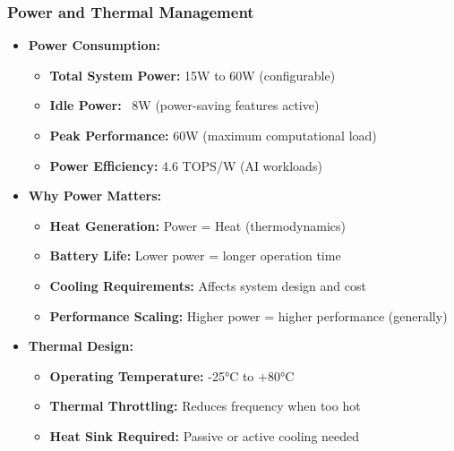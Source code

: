 \begin{frame}
\frametitle{Power and Thermal Management}
\begin{itemize}
    \item \textbf{Power Consumption:}
    \begin{itemize}
        \item \textbf{Total System Power:} 15W to 60W (configurable)
        \item \textbf{Idle Power:} ~8W (power-saving features active)
        \item \textbf{Peak Performance:} 60W (maximum computational load)
        \item \textbf{Power Efficiency:} 4.6 TOPS/W (AI workloads)
    \end{itemize}
    \item \textbf{Why Power Matters:}
    \begin{itemize}
        \item \textbf{Heat Generation:} Power = Heat (thermodynamics)
        \item \textbf{Battery Life:} Lower power = longer operation time
        \item \textbf{Cooling Requirements:} Affects system design and cost
        \item \textbf{Performance Scaling:} Higher power = higher performance (generally)
    \end{itemize}
    \item \textbf{Thermal Design:}
    \begin{itemize}
        \item \textbf{Operating Temperature:} -25°C to +80°C
        \item \textbf{Thermal Throttling:} Reduces frequency when too hot
        \item \textbf{Heat Sink Required:} Passive or active cooling needed
    \end{itemize}
\end{itemize}
\end{frame}

